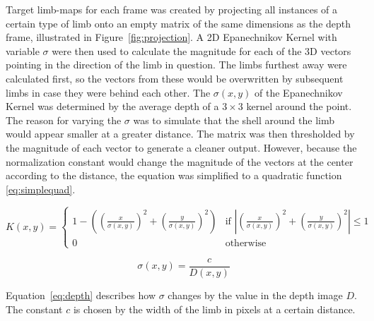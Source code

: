Target limb-maps for each frame was created by projecting all instances of a certain type of limb onto an empty matrix of the same dimensions as the depth frame, illustrated in Figure~\ref{fig:projection}. A 2D Epanechnikov Kernel with variable $\sigma$ were then used to calculate the magnitude for each of the 3D vectors pointing in the direction of the limb in question. The limbs furthest away were calculated first, so the vectors from these would be overwritten by subsequent limbs in case they were behind each other. The $\sigma(x, y)$ of the Epanechnikov Kernel was determined by the average depth of a $3 \times 3$ kernel around the point. The reason for varying the $\sigma$ was to simulate that the shell around the limb would appear smaller at a greater distance. The matrix was then thresholded by the magnitude of each vector to generate a cleaner output. However, because the normalization constant would change the magnitude of the vectors at the center according to the distance, the equation was simplified to a quadratic function \ref{eq:simplequad}.

\begin{equation}
  \label{eq:simplequad}
  K(x, y) =
  \begin{cases}
    1 - ((\frac{x}{\sigma(x, y)})^{2} + (\frac{y}{\sigma(x, y)})^{2}) & \text{if } |(\frac{x}{\sigma(x, y)})^{2} + (\frac{y}{\sigma(x, y)})^{2}| \leq 1\\
    0 & \text{otherwise}
  \end{cases}
\end{equation}

\begin{equation}
  \label{eq:depth}
  \sigma(x, y) = \frac{c}{D(x, y)}
\end{equation}

Equation~\ref{eq:depth} describes how $\sigma$ changes by the value in the depth image $D$. The constant $c$ is chosen by the width of the limb in pixels at a certain distance.


